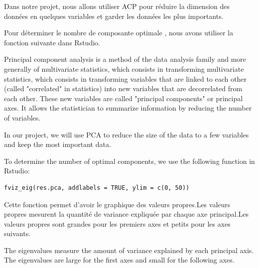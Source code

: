 \documentclass[12pt]{article}
\begin{document}
Dans notre projet, nous allons utiliser ACP pour réduire la dimension des données en quelques variables et garder les données les plus importants. 

Pour déterminer le nombre de composante optimale , nous avons utiliser la fonction suivante dans Rstudio.


Principal component analysis is a method of the data analysis family and more generally of multivariate statistics, which consists in transforming
multivariate statistics, which consists in transforming variables that are linked to each other (called "correlated" in statistics) into new variables that are decorrelated from each other. These new variables are called "principal components" or principal axes. It allows the statistician to summarize information by reducing the number of variables.

In our project, we will use PCA to reduce the size of the data to a few variables and keep the most important data. 

To determine the number of optimal components, we use the following function in Rstudio:

\begin{lstlisting}
fviz_eig(res.pca, addlabels = TRUE, ylim = c(0, 50))
\end{lstlisting} 

Cette fonction permet d'avoir le graphique des valeurs propres.Les valeurs propres mesurent la quantité de variance expliquée par chaque axe principal.Les valeurs propres sont grandes pour les premiers axes et petits pour les axes suivants.

The eigenvalues measure the amount of variance explained by each principal axis. The eigenvalues are large for the first axes and small for the following axes.


\newpage
\end{document}
